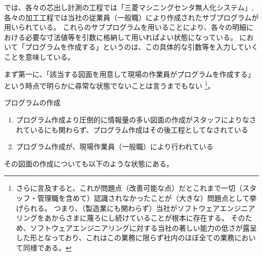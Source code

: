 

\MMname では、各々の芯出し計測の工程では「三菱マシニングセンタ無人化システム」, 各々の加工工程では当社の従業員（一般職）により作成されたサブプログラムが用いられている。
これらのサブプログラムを用いることにより、各々の明細における必要な寸法値等を引数に格納して用いればよい状態になっている。
\MMname において「プログラムを作成する」というのは、この具体的な引数等を入力していくことを意味している。



まず第一に、「該当する図面を用意して現場の作業員がプログラムを作成する」という時点で明らかに尋常な状態でないことは言うまでもない
\footnote{さらに言及すると、これが問題点（改善可能な点）だとこれまで一切（スタッフ・管理職を含めて）認識されなかったことが（大きな）問題点として挙げられる。
つまり、（製造業にも関わらず）当社がソフトウェアエンジニアリングをあからさまに蔑ろにし続けていることが根本に存在する。
そのため、ソフトウェアエンジニアリングに対する当社の著しい能力の低さが露呈した形となっており、これはこの業務に限らず社内のほぼ全ての業務において同様である。}。
\begin{Issues}{プログラムの作成}
\begin{enumerate}
\item プログラム作成より圧倒的に情報量の多い図面の作成がスタッフによりなされているにも関わらず、プログラム作成はその後工程としてなされている
\item プログラム作成が、現場作業員（一般職）により行われている
\end{enumerate}
\end{Issues}
その図面の作成についても以下のような状態にある。
